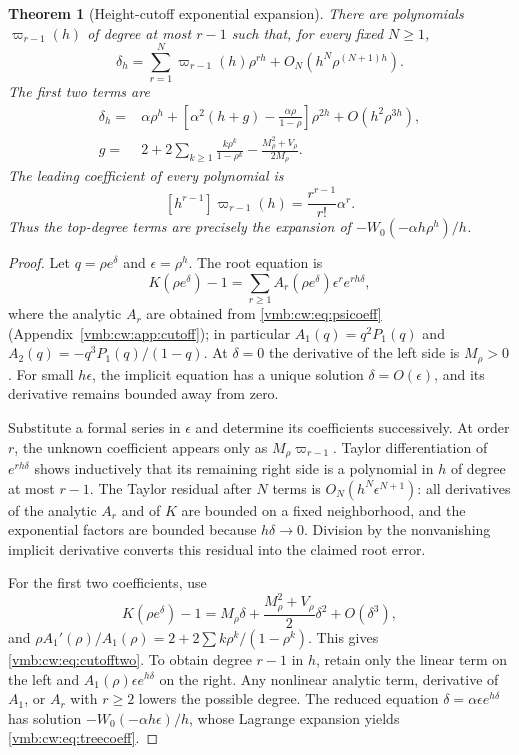 \documentclass[11pt,a4paper]{article}
\numberwithin{equation}{section}
\newtheorem{theorem}{Theorem}[section]
\theoremstyle{definition}\newtheorem{definition}[theorem]{Definition}
\theoremstyle{remark}\newtheorem{remark}[theorem]{Remark}
\begin{document}
\begin{theorem}[Height-cutoff exponential expansion]\label{vmb:cw:thm:cutoffseries}
There are polynomials $\varpi_{r-1}(h)$ of degree at most $r-1$ such that, for
every fixed $N\ge1$,
\begin{equation}\label{vmb:cw:eq:cutoffall}
 \delta_h=\sum_{r=1}^{N}\varpi_{r-1}(h)\rho^{rh}
          +O_N(h^N\rho^{(N+1)h}).
\end{equation}
The first two terms are
\begin{align}\label{vmb:cw:eq:cutofftwo}
 \delta_h={}&\alpha\rho^h+
 \left[\alpha^2(h+g)-\frac{\alpha\rho}{1-\rho}\right]\rho^{2h}
 +O(h^2\rho^{3h}),\\
 g={}&2+2\sum_{k\ge1}\frac{k\rho^k}{1-\rho^k}
       -\frac{M_\rho^2+V_\rho}{2M_\rho}.\label{vmb:cw:eq:g}
\end{align}
The leading coefficient of every polynomial is
\begin{equation}\label{vmb:cw:eq:treecoeff}
 [h^{r-1}]\varpi_{r-1}(h)=\frac{r^{r-1}}{r!}\alpha^r.
\end{equation}
Thus the top-degree terms are precisely the expansion of
$-W_0(-\alpha h\rho^h)/h$.
\end{theorem}
\begin{proof}
Let $q=\rho e^\delta$ and $\epsilon=\rho^h$. The root equation is
\[
 K(\rho e^\delta)-1
 =\sum_{r\ge1}A_r(\rho e^\delta)\epsilon^r e^{rh\delta},
\]
where the analytic $A_r$ are obtained from \eqref{vmb:cw:eq:psicoeff}
(Appendix~\ref{vmb:cw:app:cutoff}); in
particular $A_1(q)=q^2P_1(q)$ and
$A_2(q)=-q^3P_1(q)/(1-q)$. At $\delta=0$ the derivative of the left
side is $M_\rho>0$. For small $h\epsilon$, the implicit equation has a
unique solution $\delta=O(\epsilon)$, and its derivative remains bounded
away from zero.

Substitute a formal series in $\epsilon$ and determine its coefficients
successively. At order $r$, the unknown coefficient appears only as
$M_\rho \varpi_{r-1}$. Taylor differentiation of $e^{rh\delta}$ shows
inductively that its remaining right side is a polynomial in $h$ of degree
at most $r-1$. The Taylor residual after $N$ terms is
$O_N(h^N\epsilon^{N+1})$: all derivatives of the analytic $A_r$ and of
$K$ are bounded on a fixed neighborhood, and the exponential factors are
bounded because $h\delta\to0$. Division by the nonvanishing implicit
derivative converts this residual into the claimed root error.

For the first two coefficients, use
\[
 K(\rho e^\delta)-1=M_\rho\delta+
       \frac{M_\rho^2+V_\rho}{2}\delta^2+O(\delta^3),
\]
and $\rho A_1'(\rho)/A_1(\rho)=2+
2\sum k\rho^k/(1-\rho^k)$. This gives \eqref{vmb:cw:eq:cutofftwo}.
To obtain degree $r-1$ in $h$, retain only the linear term on the left
and $A_1(\rho)\epsilon e^{h\delta}$ on the right. Any nonlinear analytic
term, derivative of $A_1$, or $A_r$ with $r\ge2$ lowers the possible degree.
The reduced equation $\delta=\alpha\epsilon e^{h\delta}$ has solution
$-W_0(-\alpha h\epsilon)/h$, whose Lagrange expansion yields
\eqref{vmb:cw:eq:treecoeff}.
\end{proof}
\end{document}
